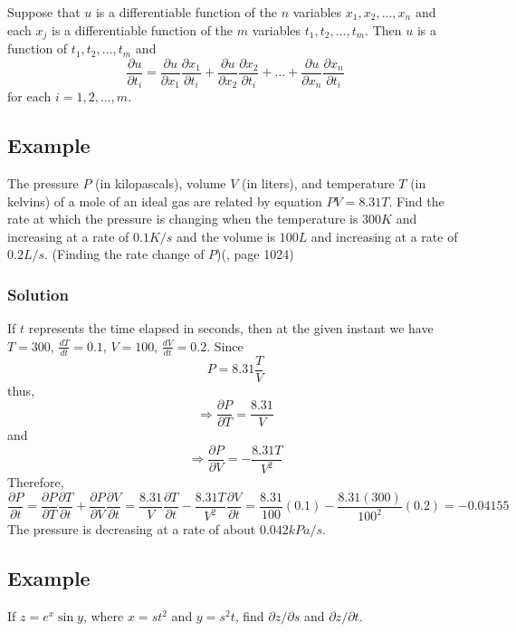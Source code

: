 \begin{definition}
    Suppose that $u$ is a differentiable function of the $n$ variables $x_1, x_2, ..., x_n$ and each $x_j$ is a differentiable function of the $m$ variables $t_1, t_2, ..., t_m$. Then $u$ is a function of $t_1, t_2, ..., t_m$ and
    \begin{equation}
        \label{The General Chain Rule}
        \frac{\partial u}{\partial t_i} = \frac{\partial u}{\partial x_1}\frac{\partial x_1}{\partial t_i} + \frac{\partial u}{\partial x_2}\frac{\partial x_2}{\partial t_i} + ...+ \frac{\partial u}{\partial x_n}\frac{\partial x_n}{\partial t_i}
    \end{equation}
    for each $i=1, 2, ..., m$.
\end{definition}

\subsection{Example}
The pressure $P$ (in kilopascals), volume $V$ (in liters), and temperature $T$ (in kelvins) of a mole of an ideal gas are related by equation $PV=8.31T$. Find the rate at which the pressure is changing when the temperature is $300K$ and increasing at a rate of $0.1K/s$ and the volume is $100L$ and increasing at a rate of $0.2L/s$. (Finding the rate change of $P$)(\cite{calculus}, page 1024)

\subsubsection{Solution}
If $t$ represents the time elapsed in seconds, then at the given instant we have $T=300$, $\frac{dT}{dt}=0.1$, $V=100$, $\frac{dV}{dt}=0.2$. Since
$$
    P = 8.31\frac{T}{V}
$$
thus,
$$
    \Rightarrow \frac{\partial P}{\partial T} = \frac{8.31}{V}
$$
and
$$
    \Rightarrow \frac{\partial P}{\partial V}=-\frac{8.31T}{V^2}
$$
Therefore,
\begin{equation}
    \frac{\partial P}{\partial t}=\frac{\partial P}{\partial T}\frac{\partial T}{\partial t} + \frac{\partial P}{\partial V}\frac{\partial V}{\partial t}=\frac{8.31}{V}\frac{\partial T}{\partial t} - \frac{8.31 T}{V^2}\frac{\partial V}{\partial t}=\frac{8.31}{100}(0.1)-\frac{8.31(300)}{100^2}(0.2)=-0.04155
\end{equation}
The pressure is decreasing at a rate of about $0.042 kPa/s$.

\subsection{Example}
If $z=e^x \sin y$, where $x=st^2$ and $y=s^2t$, find $\partial z / \partial s$ and $\partial z / \partial t$.

